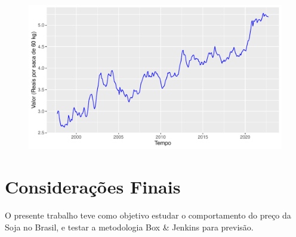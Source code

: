\documentclass[
	12pt,				%
	openright,			%
	oneside,      %
	a4paper,			%
	english,			%
	french,				%
	spanish,			%
	brazil,				%
	]{abntex2}\usepackage[]{graphicx}\usepackage[table]{xcolor}
\makeatletter
\def\maxwidth{ %
  \ifdim\Gin@nat@width>\linewidth
    \linewidth
  \else
    \Gin@nat@width
  \fi
}
\newenvironment{knitrout}{}{} %
\theoremstyle{definition}
\theoremstyle{remark}
\makeatother
\begin{document}
\begin{knitrout}
\color{fgcolor}\begin{figure}
\includegraphics[width=\maxwidth]{figure/script6-1} \end{figure}

\end{knitrout}





\chapter{Considerações Finais}

O presente trabalho teve como objetivo estudar o comportamento do preço da Soja no Brasil, e testar a metodologia Box \& Jenkins para previsão.





%
%



\end{document}
